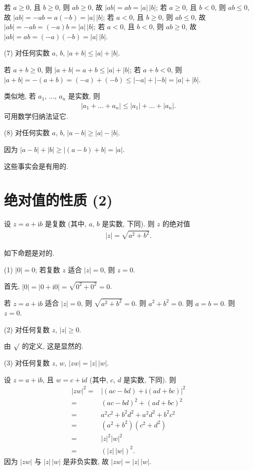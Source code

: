 \documentclass[../libro.tex]{subfiles}
\begin{document}
若 \(a \geq 0\), 且 \(b \geq 0\),
则 \(ab \geq 0\),
故 \(|ab| = ab = |a|\, |b|\);
若 \(a \geq 0\), 且 \(b < 0\),
则 \(ab \leq 0\),
故 \(|ab| = -ab = a(-b) =|a|\, |b|\);
若 \(a < 0\), 且 \(b \geq 0\),
则 \(ab \leq 0\),
故 \(|ab| = -ab = (-a)b = |a|\, |b|\);
若 \(a < 0\), 且 \(b < 0\),
则 \(ab \geq 0\),
故 \(|ab| = ab = (-a)(-b) = |a|\, |b|\).

(7)
对任何实数 \(a\), \(b\), \(|{a + b}| \leq |a| + |b|\).

若 \(a + b \geq 0\), 则 \(|{a + b}| = a + b \leq |a| + |b|\);
若 \(a + b < 0\), 则 \(|{a + b}| = -(a + b)
= (-a) + (-b) \leq |{-a}| + |{-b}| = |a| + |b|\).

类似地, 若 \(a_1\), \(\dots\), \(a_n\) 是实数, 则
\begin{align*}
    |{a_1 + \dots + a_n}| \leq |a_1| + \dots + |a_n|.
\end{align*}
可用数学归纳法证它.

(8)
对任何实数 \(a\), \(b\), \(|{a - b}| \geq |a| - |b|\).

因为 \(|{a - b}| + |b| \geq |{(a - b) + b}| = |a|\).

\vspace{2ex}

这些事实会是有用的.

\section{绝对值的性质 (2)}

设 \(z = a + \mathrm{i} b\) 是复数
(其中, \(a\), \(b\) 是实数, 下同).
则 \(z\) 的绝对值
\begin{align*}
    |z| = \sqrt{a^2 + b^2}.
\end{align*}

如下命题是对的.

(1)
\(|0| = 0\);
若复数 \(z\) 适合 \(|z| = 0\), 则 \(z = 0\).

首先, \(|0| = |{0 + \mathrm{i} 0}| = \sqrt{0^2 + 0^2} = 0\).

若 \(z = a + \mathrm{i} b\) 适合 \(|z| = 0\),
则 \(\sqrt{a^2 + b^2} = 0\).
则 \(a^2 + b^2 = 0\).
则 \(a = b = 0\).
则 \(z = 0\).

(2)
对任何复数 \(z\), \(|z| \geq 0\).

由 \(\surd\) 的定义, 这是显然的.

(3)
对任何复数 \(z\), \(w\), \(|zw| = |z|\, |w|\).

设 \(z = a + \mathrm{i} b\), 且 \(w = c + \mathrm{i} d\)
(其中, \(c\), \(d\) 是实数, 下同).
则
\begin{align*}
    |zw|^2
    = {} & |{(ac - bd) + \mathrm{i} (ad + bc)}|^2 \\
    = {} & (ac - bd)^2 + (ad + bc)^2              \\
    = {} & a^2 c^2 + b^2 d^2 + a^2 d^2 + b^2 c^2  \\
    = {} & (a^2 + b^2) (c^2 + d^2)                \\
    = {} & |z|^2 |w|^2                            \\
    = {} & (|z|\, |w|)^2.
\end{align*}
因为 \(|zw|\) 与 \(|z|\, |w|\) 是非负实数,
故 \(|zw| = |z|\, |w|\).
\end{document}
